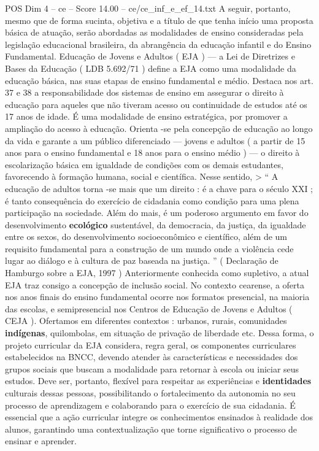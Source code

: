 \begin{textsample}{POS Dim 4 – ce – Score 14.00 – ce/ce\_inf\_e\_ef\_14.txt}
A seguir, portanto, mesmo que de forma sucinta, objetiva e a título de que tenha início uma proposta básica de atuação, serão abordadas as modalidades de ensino consideradas pela legislação educacional brasileira, da abrangência da educação infantil e do Ensino Fundamental.
Educação de Jovens e Adultos ( EJA ) — a Lei de Diretrizes e Bases da Educação ( LDB 5.692/71 ) define a EJA como uma modalidade da educação básica, nas suas etapas de ensino fundamental e médio.
Destaca nos art. 37 e 38 a responsabilidade dos sistemas de ensino em assegurar o direito à educação para aqueles que não tiveram acesso ou continuidade de estudos até os 17 anos de idade.
É uma modalidade de ensino estratégica, por promover a ampliação do acesso à educação.
Orienta -se pela concepção de educação ao longo da vida e garante a um público diferenciado — jovens e adultos ( a partir de 15 anos para o ensino fundamental e 18 anos para o ensino médio ) — o direito à escolarização básica em igualdade de condições com os demais estudantes, favorecendo à formação humana, social e científica.
Nesse sentido, > “ A educação de adultos torna -se mais que um direito : é a chave para o século XXI ; é tanto consequência do exercício de cidadania como condição para uma plena participação na sociedade.
Além do mais, é um poderoso argumento em favor do desenvolvimento \textbf{ecológico} sustentável, da democracia, da justiça, da igualdade entre os sexos, do desenvolvimento socioeconômico e científico, além de um requisito fundamental para a construção de um mundo onde a violência cede lugar ao diálogo e à cultura de paz baseada na justiça. ” ( Declaração de Hamburgo sobre a EJA, 1997 ) Anteriormente conhecida como supletivo, a atual EJA traz consigo a concepção de inclusão social.
No contexto cearense, a oferta nos anos finais do ensino fundamental ocorre nos formatos presencial, na maioria das escolas, e semipresencial nos Centros de Educação de Jovens e Adultos ( CEJA ).
Ofertamos em diferentes contextos : urbanos, rurais, comunidades \textbf{indígenas}, quilombolas, em situação de privação de liberdade etc.
Dessa forma, o projeto curricular da EJA considera, regra geral, os componentes curriculares estabelecidos na BNCC, devendo atender às características e necessidades dos grupos sociais que buscam a modalidade para retornar à escola ou iniciar seus estudos.
Deve ser, portanto, flexível para respeitar as experiências e \textbf{identidades} culturais dessas pessoas, possibilitando o fortalecimento da autonomia no seu processo de aprendizagem e colaborando para o exercício de sua cidadania.
É essencial que a ação curricular integre os conhecimentos ensinados à realidade dos alunos, garantindo uma contextualização que torne significativo o processo de ensinar e aprender.

\end{textsample}
